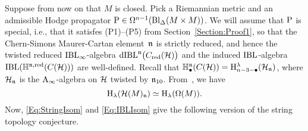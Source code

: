 \documentclass[\MainFolder/Text.tex]{subfiles}
\begin{document}
Suppose from now on that $M$ is closed. Pick a Riemannian metric and an admissible Hodge propagator $\mathrm{P} \in \Omega^{n-1}(\mathrm{Bl}_\Delta(M\times M))$. We will assume that $\mathrm{P}$ is special, i.e., that it satisfes (P1)--(P5) from Section~\ref{Section:Proof1}, so that the Chern-Simons Maurer-Cartan element~$\mathfrak{n}$ is strictly reduced, and hence the twisted reduced $\mathrm{IBL}_\infty$-algebra $\mathrm{dIBL}^{\mathfrak{n}}\bigl(C_{\mathrm{red}}(\mathcal{H})\bigr)$ and the induced $\mathrm{IBL}$-algebra $\mathrm{IBL}(\mathbb{H}^{\mathfrak{n},\mathrm{red}}(C(\mathcal{H})))$ are well-defined.
Recall that $\mathbb{H}^{\mathfrak{n}}_\bullet(C(\mathcal{H})) = \mathrm{H}^{\lambda}_{n-3-\bullet}(\mathcal{H}_{\mathfrak{n}})$, where $\mathcal{H}_{\mathfrak{n}}$ is the $\mathrm{A}_\infty$-algebra on $\mathcal{H}$ twisted by $\mathfrak{n}_{10}$. From~\cite{Cieliebak2018}, we have
\begin{equation}\label{Eq:IBLIsom}
\mathrm{H}_{\lambda}(\mathcal{H}(M)_{\mathfrak{n}}) \simeq \mathrm{H}_{\lambda}(\Omega(M)).
\end{equation}
Now, \eqref{Eq:StringIsom} and \eqref{Eq:IBLIsom} give the following version of the string topology conjecture.

%
%
\end{document}
